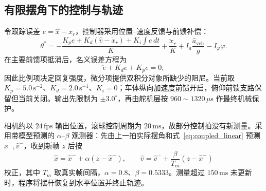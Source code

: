 \documentclass[12pt,a4paper]{ctexart}
\newcommand{\unit}[1]{\ensuremath{\,\mathrm{#1}}}
\newcommand{\us}{\ensuremath{\,\mu\mathrm{s}}}
\begin{document}
\subsection{有限摆角下的控制与轨迹}

令跟踪误差 $e=\hat x-x_r$，控制器采用位置--速度反馈与前馈补偿：
\begin{equation}
 \theta^*=-\frac{K_pe+K_d(\hat v-\dot x_r)+K_i\!\int e\,dt}{K}
 +\frac{\ddot x_r}{K}+I_a\frac{\hat a_{\mathrm{veh}}}{g}-I_\varphi\varphi .
\label{eq:control}
\end{equation}
在主要前馈项抵消后，名义误差方程为
\begin{equation}
 \ddot e+K_d\dot e+K_pe=0,
\end{equation}
因此比例项决定回复强度，微分项提供双积分对象所缺少的阻尼。当前取 $K_p=5.0\unit{s^{-2}}$、$K_d=2.0\unit{s^{-1}}$、$K_i=0$；车体纵向加速度前馈开启，俯仰前馈支路保留但当前关闭。输出先限制为 $\pm3.0^\circ$，再由舵机层按 $960\sim1320\us$ 作最终机械保护。

相机约以 $24\unit{fps}$ 输出位置，滚球控制周期为 $20\unit{ms}$，故部分控制拍没有新测量。采用带模型预测的 $\alpha$--$\beta$ 观测器：先由上一拍实际摆角和式~\eqref{eq:coupled_linear} 预测 $\hat x^-,\hat v^-$，收到新帧 $z$ 后按
\begin{equation}
 \hat x=\hat x^-+\alpha(z-\hat x^-),\qquad
 \hat v=\hat v^-+\frac{\beta}{T_m}(z-\hat x^-)
\end{equation}
校正，其中 $T_m$ 取真实帧间隔，$\alpha=0.8$、$\beta=0.5333$。测量超过 $150\unit{ms}$ 未更新时，程序将摆杆恢复到水平位置并终止轨迹。
\end{document}
